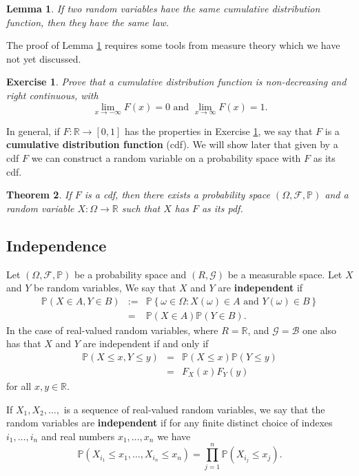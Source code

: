 \documentclass[12pt, reqno]{amsart}
\newtheorem{theorem}{Theorem}
\newtheorem{lemma}[theorem]{Lemma}
\newtheorem{ex}{Exercise}[section]
\newcommand\dff[1]{\textbf{#1}}
\newcommand\ns[1]{ \left\{ {#1} \right\} }
\renewcommand{\P}{{\mathbb P}}  %
\newcommand{\R}{{\mathbb R}}
\newcommand{\F}{{\mathcal F}}     %
\begin{document}
\begin{lemma}
\label{law}
If two random variables have the same cumulative distribution function,  then they have the same law.
\end{lemma}

The proof of Lemma \ref{law} requires some tools from measure theory which we have not yet discussed.  



\begin{ex}  
\label{cdf}
Prove that a cumulative distribution function is non-decreasing and right continuous, with $$\lim_{x \to -\infty} F(x) = 0 \text{ and }  \lim_{x \to \infty} F(x) = 1.$$
\end{ex}


In general, if $F: \R \to [0,1]$ has the properties in Exercise \ref{cdf}, we say that $F$ is a \dff{cumulative distribution function}  (cdf).  We will show later that given by a cdf $F$ we can construct a random variable on a probability space with $F$ as its cdf.

\begin{theorem}  If $F$ is a cdf, then there exists a probability space $(\Omega, \F, \P)$ and a random variable $X: \Omega \to \R$ such that $X$ has $F$ as its pdf.

\end{theorem}


\subsection{Independence}

Let $(\Omega, \F, \P)$ be a probability space and $(R, \mathcal{G})$ be a measurable space.    Let $X$ and $Y$ be random variables,  We say that $X$ and $Y$ are \dff{independent} if 
\begin{eqnarray*}
\P(X \in A, Y \in B) &:=& \P\ns{\omega \in \Omega:  X(\omega) \in A \text{ and }  Y(\omega) \in B} \\
&=& \P(X \in A) \P (Y \in B).
\end{eqnarray*}
In the case of real-valued random variables, where $R = \R$, and $\mathcal{G} = \mathcal{B}$ one also has that $X$ and $Y$ are independent if and only if
\begin{eqnarray*}
\P(X \leq x, Y\leq y) &=& \P(X \leq x) \P(Y \leq y) \\
&=& F_X(x) F_Y(y)
\end{eqnarray*}
for all $x,y \in \R$.  


If $X_1, X_2, \ldots, $ is a sequence of real-valued random variables, we say that the random variables are \dff{independent} if for any finite distinct choice of indexes $i_1, \ldots, i_n$ and real numbers $x_1, \ldots, x_n$ we have
$$\P(X_{i_1} \leq x_1, \ldots, X_{i_n} \leq x_n) = \prod_{j=1} ^n \P(X_{i_j} \leq x_{j}).$$
\end{document}
